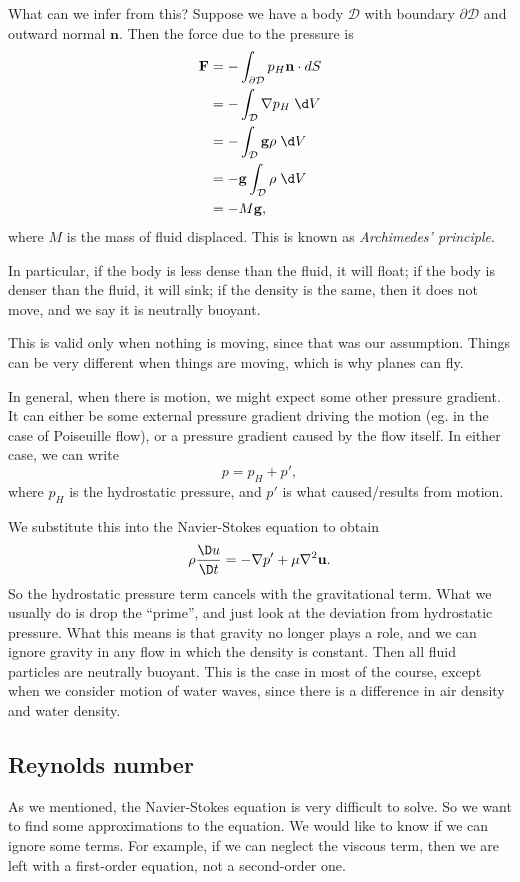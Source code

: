 \documentclass[a4paper]{article}
\begin{document}
What can we infer from this? Suppose we have a body $\mathcal{D}$ with boundary $\partial \mathcal{D}$ and outward normal $\mathbf{n}$. Then the force due to the pressure is
\begin{align*}
  \mathbf{F} &= - \int_{\partial \mathcal{D}} p_H \mathbf{n}\cdot dS \\
  &= - \int_\mathcal{D} \nabla p_H \;\d V\\
  &= - \int_{\mathcal{D}} \mathbf{g} \rho \;\d V\\
  &= - \mathbf{g} \int_\mathcal{D} \rho \;\d V\\
  &= - M\mathbf{g},
\end{align*}
where $M$ is the mass of fluid displaced. This is known as \emph{Archimedes' principle}.

In particular, if the body is less dense than the fluid, it will float; if the body is denser than the fluid, it will sink; if the density is the same, then it does not move, and we say it is neutrally buoyant.

This is valid only when nothing is moving, since that was our assumption. Things can be very different when things are moving, which is why planes can fly.

In general, when there is motion, we might expect some other pressure gradient. It can either be some external pressure gradient driving the motion (eg. in the case of Poiseuille flow), or a pressure gradient caused by the flow itself. In either case, we can write
\[
  p = p_H + p',
\]
where $p_H$ is the hydrostatic pressure, and $p'$ is what caused/results from motion.

We substitute this into the Navier-Stokes equation to obtain
\[
  \rho \frac{\D u}{\D t} = -\nabla p' + \mu \nabla^2 \mathbf{u}.
\]
So the hydrostatic pressure term cancels with the gravitational term. What we usually do is drop the ``prime'', and just look at the deviation from hydrostatic pressure. What this means is that gravity no longer plays a role, and we can ignore gravity in any flow in which the density is constant. Then all fluid particles are neutrally buoyant. This is the case in most of the course, except when we consider motion of water waves, since there is a difference in air density and water density.

\subsection{Reynolds number}
As we mentioned, the Navier-Stokes equation is very difficult to solve. So we want to find some approximations to the equation. We would like to know if we can ignore some terms. For example, if we can neglect the viscous term, then we are left with a first-order equation, not a second-order one.
\end{document}
